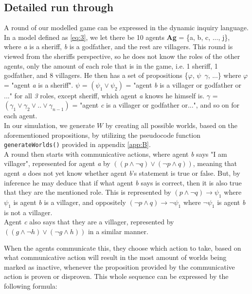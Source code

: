 \subsection{Detailed run through}\label{sec:ARoundOfTheGame}
A round of our modelled game can be expressed in the dynamic inquiry language.
In a model defined as \cref{eq:3}, we let there be 10 agents \textbf{Ag} = \{a,
b, c, ..., j\}, where \textit{a} is a sheriff, \textit{b} is a godfather, and
the rest are villagers. This round is viewed from the sheriffs perspective, so
he does not know the roles of the other agents, only the amount of each role
that is in the game, i.e. 1 sheriff, 1 godfather, and 8 villagers. He then has
a set of propositions \{$\varphi$, $\psi$\, $\gamma$, ...\} where $\varphi$ =
"agent \textit{a} is a sheriff". $\psi$ = $(\psi_1 \lor \psi_2)$ = "agent
\textit{b} is a villager or godfather or ..." for all \textit{3} roles, except
sheriff, which agent \textit{a} knows he himself is. $\gamma$ = $(\gamma_1 \lor
	\gamma_2 \lor .. \lor \gamma_{n-1}) $ = "agent \textit{c} is a villager or
godfather or...", and so on for each agent. \\ In our simulation, we generate
$W$ by creating all possible worlds, based on the aforementioned propositions,
by utilizing the pseudocode function
\lstinline{generateWorlds()} provided in appendix \ref{app:B}. \\ A round then
starts with communicative actions, where agent \textit{b} says "I am villager",
represented for agent \textit{a} by $((p \land \neg q) \lor (\neg p \land q))$,
 meaning that agent \textit{a} does not yet know whether
agent \textit{b}'s statement is true or false. But, by inference he may deduce
that if what agent \textit{b} says is correct, then it is also true that they
are the mentioned role. This is represented by $(p \land \neg q) \rightarrow
	\psi_1$ where $\psi_1$ is agent \textit{b} is a villager, and oppositely $(\neg
	p \land q) \rightarrow \neg \psi_1$ where $\neg \psi_1$ is agent \textit{b} is
not a villager. \\ Agent \textit{c} also says that they are a villager,
represented by $((g \land \neg h) \lor (\neg g \land h))$ in a similar manner.



When the agents communicate this, they choose which action to take, based on
what communicative action will result in the most amount of worlds being marked
as inactive, whenever the proposition provided by the communicative action is
proven or disproven. This whole sequence can be
expressed by the following formula:

